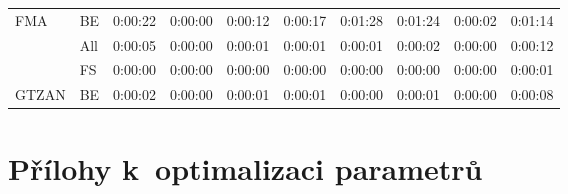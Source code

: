 \begin{table}[H]
{\begin{tabular}{llllllllll}
    \multirow{-3}{*}{FMA}   & \multicolumn{1}{l|}{\cellcolor[HTML]{EFEFEF}BE}  & \cellcolor[HTML]{EFEFEF}0:00:22 & \cellcolor[HTML]{EFEFEF}0:00:00 & \cellcolor[HTML]{EFEFEF}0:00:12 & \cellcolor[HTML]{EFEFEF}0:00:17 & \cellcolor[HTML]{EFEFEF}0:01:28 & \cellcolor[HTML]{EFEFEF}0:01:24 & \cellcolor[HTML]{EFEFEF}0:00:02 & \cellcolor[HTML]{EFEFEF}0:01:14 \\ \cline{1-2}
                            & \multicolumn{1}{l|}{All}                         & 0:00:05                         & 0:00:00                         & 0:00:01                         & 0:00:01                         & 0:00:01                         & 0:00:02                         & 0:00:00                         & 0:00:12                         \\
                            & \multicolumn{1}{l|}{\cellcolor[HTML]{EFEFEF}FS}  & \cellcolor[HTML]{EFEFEF}0:00:00 & \cellcolor[HTML]{EFEFEF}0:00:00 & \cellcolor[HTML]{EFEFEF}0:00:00 & \cellcolor[HTML]{EFEFEF}0:00:00 & \cellcolor[HTML]{EFEFEF}0:00:00 & \cellcolor[HTML]{EFEFEF}0:00:00 & \cellcolor[HTML]{EFEFEF}0:00:00 & \cellcolor[HTML]{EFEFEF}0:00:01 \\
    \multirow{-3}{*}{GTZAN} & \multicolumn{1}{l|}{BE}                          & 0:00:02                         & 0:00:00                         & 0:00:01                         & 0:00:01                         & 0:00:00                         & 0:00:01                         & 0:00:00                         & 0:00:08                        
    \end{tabular}}
\end{table}

\chapter{Přílohy k~optimalizaci parametrů}
\label{prilohy_k_optimalizaci_parametru}

